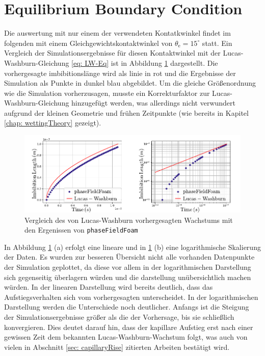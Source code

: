 \section{Equilibrium Boundary Condition} 
\label{sec: EquilibriumBoundaryCondition}
Die auswertung mit nur einem der verwendeten Kontatkwinkel findet im folgenden mit einem Gleichgewichtskontaktwinkel von $\theta_{\mathrm{e}}=15^{\circ}$ statt. Ein Vergleich der Simulationsergebnisse für diesen Kontaktwinkel mit der Lucas-Washburn-Gleichung \ref{eq: LW-Eq} ist in Abbildung \ref{fig: LW-PFF_comp} dargestellt. Die vorhergesagte imbibitionslänge wird als linie in rot und die Ergebnisse der Simulation als Punkte in dunkel blau abgebildet. Um die gleiche Größenordnung wie die Simulation vorherzusagen, musste ein Korrekturfaktor zur Lucas-Washburn-Gleichung hinzugefügt werden, was allerdings nicht verwundert aufgrund der kleinen Geometrie und frühen Zeitpunkte (wie bereits in Kapitel \ref{chap: wettingTheory} gezeigt).
\begin{figure}[h]
    \centering
    \includegraphics[width=.95\textwidth]{Pictures/LW-lin_loglog.pdf}
    \caption{Vergleich des von Lucas-Washburn vorhergesagten Wachstums mit den Ergenissen von \texttt{phaseFieldFoam}}
    \label{fig: LW-PFF_comp}
\end{figure}
In Abbildung \ref{fig: LW-PFF_comp} (a) erfolgt eine lineare und in \ref{fig: LW-PFF_comp} (b) eine logarithmische Skalierung der Daten. Es wurden zur besseren Übersicht nicht alle vorhanden Datenpunkte der Simulation geplottet, da diese vor allem in der logarithmischen Darstellung sich gegenseitig überlagern würden und die darstellung unübersichtlich machen würden.  
In der linearen Darstellung wird bereits deutlich, dass das Aufstiegsverhalten sich vom vorhergesagten unterscheidet. In der logarithmischen Darstellung werden die Unterschiede noch deutlicher. Anfangs ist die Steigung der Simulationsergebnisse größer als die der Vorhersage, bis sie schließlich konvergieren. Dies deutet darauf hin, dass der kapillare Aufstieg erst nach einer gewissen Zeit dem bekannten Lucas-Washburn-Wachstum folgt, was auch von vielen in Abschnitt \ref{sec: capillaryRise} zitierten Arbeiten bestätigt wird. 


